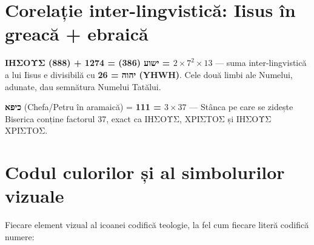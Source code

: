 \documentclass[12pt,a4paper,twoside,openany]{book}
\begin{document}
\section*{Corelație inter-lingvistică: Iisus în greacă + ebraică}
\textbf{ΙΗΣΟΥΣ (888) + ישוע (386) = 1274 = $2 \times 7^2 \times 13$} --- suma inter-lingvistică a lui Iisus e divisibilă cu \textbf{26 = יהוה (YHWH)}. Cele două limbi ale Numelui, adunate, dau semnătura Numelui Tatălui.

\textbf{כיפא} (Chefa/Petru în aramaică) = \textbf{111 = $3 \times 37$} --- Stânca pe care se zidește Biserica conține factorul 37, exact ca ΙΗΣΟΥΣ, ΧΡΙΣΤΟΣ și ΙΗΣΟΥΣ ΧΡΙΣΤΟΣ.

\section*{Codul culorilor și al simbolurilor vizuale}

Fiecare element vizual al icoanei codifică teologie, la fel cum fiecare literă codifică numere:
\end{document}
